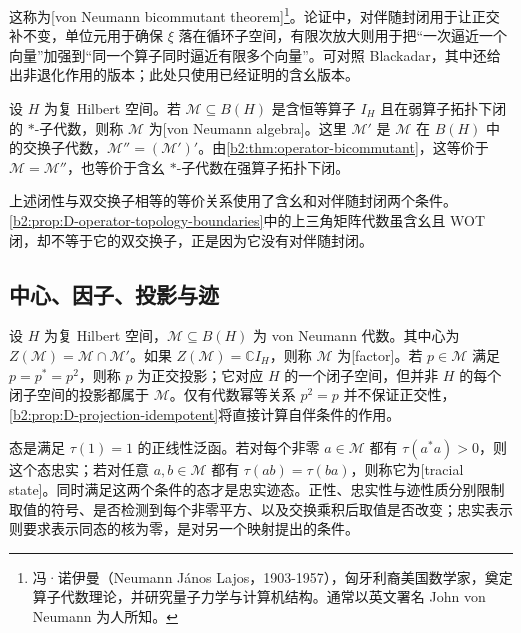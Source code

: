 这称为[von Neumann bicommutant theorem]\footnote{冯·诺伊曼（Neumann János Lajos，1903-1957），匈牙利裔美国数学家，奠定算子代数理论，并研究量子力学与计算机结构。通常以英文署名 John von Neumann 为人所知。}。论证中，对伴随封闭用于让正交补不变，单位元用于确保 \(\xi\) 落在循环子空间，有限次放大则用于把“一次逼近一个向量”加强到“同一个算子同时逼近有限多个向量”。可对照 Blackadar\cite[Theorem I.9.1.1; Corollary I.9.1.2]{Blackadar2017OperatorAlgebrasCorrected}，其中还给出非退化作用的版本；此处只使用已经证明的含幺版本。

\begin{definition}\label{b2:def:von-neumann-algebra}
	设 \(H\) 为复 Hilbert 空间。若 \(\mathcal M\subseteq B(H)\) 是含恒等算子 \(I_H\) 且在弱算子拓扑下闭的 \(*\)-子代数，则称 \(\mathcal M\) 为[von Neumann algebra]。这里 \(\mathcal M'\) 是 \(\mathcal M\) 在 \(B(H)\) 中的交换子代数，\(\mathcal M''=(\mathcal M')'\)。由\cref{b2:thm:operator-bicommutant}，这等价于 \(\mathcal M=\mathcal M''\)，也等价于含幺 \(*\)-子代数在强算子拓扑下闭。
\end{definition}

上述闭性与双交换子相等的等价关系使用了含幺和对伴随封闭两个条件。\cref{b2:prop:D-operator-topology-boundaries}中的上三角矩阵代数虽含幺且 WOT 闭，却不等于它的双交换子，正是因为它没有对伴随封闭。

\subsection{中心、因子、投影与迹}
\label{b2:subsec:D04:03}

设 \(H\) 为复 Hilbert 空间，\(\mathcal M\subseteq B(H)\) 为 von Neumann 代数。其中心为 \(Z(\mathcal M)=\mathcal M\cap\mathcal M'\)。如果 \(Z(\mathcal M)=\mathbb C I_H\)，则称 \(\mathcal M\) 为[factor]。若 \(p\in\mathcal M\) 满足 \(p=p^*=p^2\)，则称 \(p\) 为正交投影；它对应 \(H\) 的一个闭子空间，但并非 \(H\) 的每个闭子空间的投影都属于 \(\mathcal M\)。仅有代数幂等关系 \(p^2=p\) 并不保证正交性，\cref{b2:prop:D-projection-idempotent}将直接计算自伴条件的作用。

\ProseParagraphBreak
态是满足 \(\tau(1)=1\) 的正线性泛函。若对每个非零 \(a\in\mathcal M\) 都有 \(\tau(a^*a)>0\)，则这个态忠实；若对任意 \(a,b\in\mathcal M\) 都有 \(\tau(ab)=\tau(ba)\)，则称它为[tracial state]。同时满足这两个条件的态才是忠实迹态。正性、忠实性与迹性质分别限制取值的符号、是否检测到每个非零平方、以及交换乘积后取值是否改变；忠实表示则要求表示同态的核为零，是对另一个映射提出的条件。

